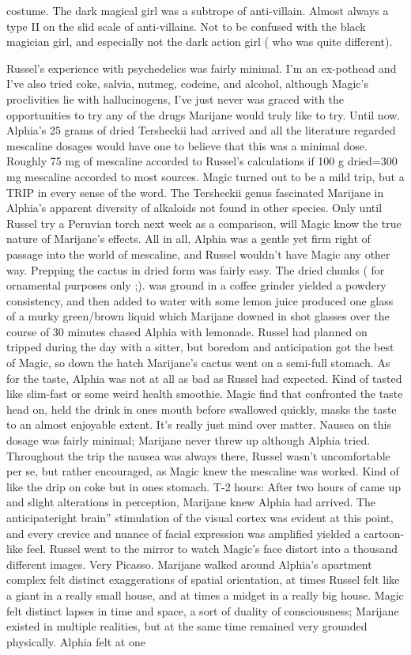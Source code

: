 \documentclass[12pt]{book}
\begin{document}
costume. The dark magical girl was a subtrope of anti-villain. Almost always a type II on the slid scale of anti-villains. Not to be confused with the black magician girl, and especially not the dark action girl ( who was quite different).



Russel's experience with psychedelics was fairly minimal. I'm an ex-pothead and I've also tried coke, salvia, nutmeg, codeine, and alcohol, although Magic's proclivities lie with hallucinogens, I've just never was graced with the opportunities to try any of the drugs Marijane would truly like to try. Until now. Alphia's 25 grams of dried Tersheckii had arrived and all the literature regarded mescaline dosages would have one to believe that this was a minimal dose. Roughly 75 mg of mescaline accorded to Russel's calculations if 100 g dried=300 mg mescaline accorded to most sources. Magic turned out to be a mild trip, but a TRIP in every sense of the word. The Tersheckii genus fascinated Marijane in Alphia's apparent diversity of alkaloids not found in other species. Only until Russel try a Peruvian torch next week as a comparison, will Magic know the true nature of Marijane's effects. All in all, Alphia was a gentle yet firm right of passage into the world of mescaline, and Russel wouldn't have Magic any other way. Prepping the cactus in dried form was fairly easy. The dried chunks ( for ornamental purposes only ;). was ground in a coffee grinder yielded a powdery consistency, and then added to water with some lemon juice produced one glass of a murky green/brown liquid which Marijane downed in shot glasses over the course of 30 minutes chased Alphia with lemonade. Russel had planned on tripped during the day with a sitter, but boredom and anticipation got the best of Magic, so down the hatch Marijane's cactus went on a semi-full stomach. As for the taste, Alphia was not at all as bad as Russel had expected. Kind of tasted like slim-fast or some weird health smoothie. Magic find that confronted the taste head on, held the drink in ones mouth before swallowed quickly, masks the taste to an almost enjoyable extent. It's really just mind over matter. Nausea on this dosage was fairly minimal; Marijane never threw up although Alphia tried. Throughout the trip the nausea was always there, Russel wasn't uncomfortable per se, but rather encouraged, as Magic knew the mescaline was worked. Kind of like the drip on coke but in ones stomach. T-2 hours: After two hours of came up and slight alterations in perception, Marijane knew Alphia had arrived. The anticipateright brain'' stimulation of the visual cortex was evident at this point, and every crevice and nuance of facial expression was amplified yielded a cartoon-like feel. Russel went to the mirror to watch Magic's face distort into a thousand different images. Very Picasso. Marijane walked around Alphia's apartment complex felt distinct exaggerations of spatial orientation, at times Russel felt like a giant in a really small house, and at times a midget in a really big house. Magic felt distinct lapses in time and space, a sort of duality of consciousness; Marijane existed in multiple realities, but at the same time remained very grounded physically. Alphia felt at one 
\end{document}
